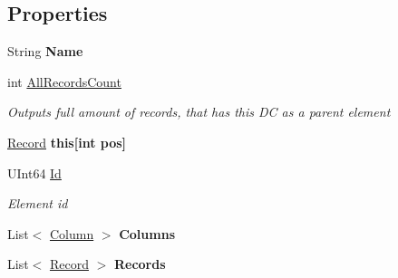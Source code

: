 \subsection*{Properties}
\begin{DoxyCompactItemize}
\item 
\hypertarget{class_dwarf_d_b_1_1_data_structures_1_1_data_container_ac285de692141c079be1bce8dccebb859}{String {\bfseries Name}}\label{class_dwarf_d_b_1_1_data_structures_1_1_data_container_ac285de692141c079be1bce8dccebb859}

\item 
int \hyperlink{class_dwarf_d_b_1_1_data_structures_1_1_data_container_af2f2d766cbb2729f91effb3c68fd97e0}{All\+Records\+Count}
\begin{DoxyCompactList}\small\item\em Outputs full amount of records, that has this D\+C as a parent element \end{DoxyCompactList}\item 
\hypertarget{class_dwarf_d_b_1_1_data_structures_1_1_data_container_a8b12c9bac22fa5ad7d007267f06e20c1}{\hyperlink{class_dwarf_d_b_1_1_data_structures_1_1_record}{Record} {\bfseries this\mbox{[}int pos\mbox{]}}}\label{class_dwarf_d_b_1_1_data_structures_1_1_data_container_a8b12c9bac22fa5ad7d007267f06e20c1}

\item 
U\+Int64 \hyperlink{class_dwarf_d_b_1_1_data_structures_1_1_data_container_a3e5849e957860912c9050dbd84818dfd}{Id}
\begin{DoxyCompactList}\small\item\em Element id \end{DoxyCompactList}\item 
\hypertarget{class_dwarf_d_b_1_1_data_structures_1_1_data_container_a4b7bab104009e416ea771276c2e7161a}{List$<$ \hyperlink{class_dwarf_d_b_1_1_data_structures_1_1_column}{Column} $>$ {\bfseries Columns}}\label{class_dwarf_d_b_1_1_data_structures_1_1_data_container_a4b7bab104009e416ea771276c2e7161a}

\item 
\hypertarget{class_dwarf_d_b_1_1_data_structures_1_1_data_container_a04e95f117bfb96a32811e7bfeb6c7c32}{List$<$ \hyperlink{class_dwarf_d_b_1_1_data_structures_1_1_record}{Record} $>$ {\bfseries Records}}\label{class_dwarf_d_b_1_1_data_structures_1_1_data_container_a04e95f117bfb96a32811e7bfeb6c7c32}

\end{DoxyCompactItemize}


